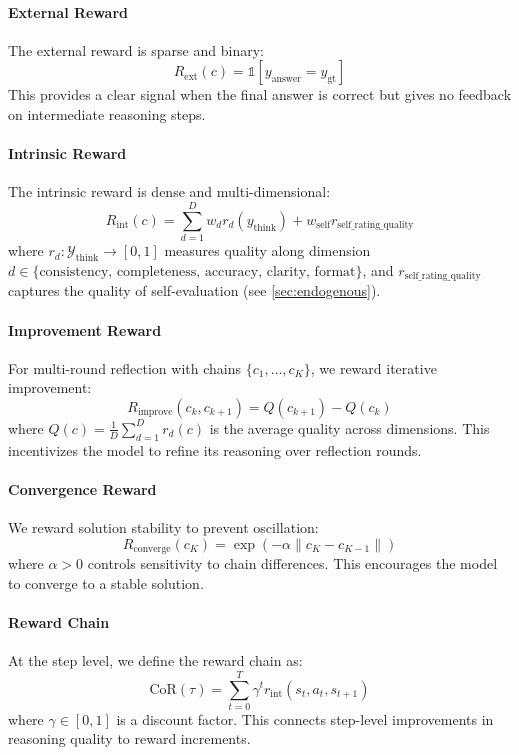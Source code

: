 \documentclass{article}
\theoremstyle{plain}
\theoremstyle{definition}
\theoremstyle{remark}
\begin{document}
\paragraph{External Reward} The external reward is sparse and binary:
\begin{equation}
R_{\text{ext}}(c) = \mathbb{1}[y_{\text{answer}} = y_{\text{gt}}]
\end{equation}
This provides a clear signal when the final answer is correct but gives no feedback on intermediate reasoning steps.

\paragraph{Intrinsic Reward} The intrinsic reward is dense and multi-dimensional:
\begin{equation}
R_{\text{int}}(c) = \sum_{d=1}^{D} w_d r_d(y_{\text{think}}) + w_{\text{self}} r_{\text{self\_rating\_quality}}
\end{equation}
where $r_d: \mathcal{Y}_{\text{think}} \to [0,1]$ measures quality along dimension $d \in \{\text{consistency, completeness, accuracy, clarity, format}\}$, and $r_{\text{self\_rating\_quality}}$ captures the quality of self-evaluation (see \autoref{sec:endogenous}).

\paragraph{Improvement Reward} For multi-round reflection with chains $\{c_1, \ldots, c_K\}$, we reward iterative improvement:
\begin{equation}
R_{\text{improve}}(c_k, c_{k+1}) = Q(c_{k+1}) - Q(c_k)
\end{equation}
where $Q(c) = \frac{1}{D}\sum_{d=1}^{D} r_d(c)$ is the average quality across dimensions. This incentivizes the model to refine its reasoning over reflection rounds.

\paragraph{Convergence Reward} We reward solution stability to prevent oscillation:
\begin{equation}
R_{\text{converge}}(c_K) = \exp(-\alpha \|c_K - c_{K-1}\|)
\end{equation}
where $\alpha > 0$ controls sensitivity to chain differences. This encourages the model to converge to a stable solution.

\paragraph{Reward Chain} At the step level, we define the reward chain as:
\begin{equation}
\text{CoR}(\tau) = \sum_{t=0}^{T} \gamma^t r_{\text{int}}(s_t, a_t, s_{t+1})
\end{equation}
where $\gamma \in [0,1]$ is a discount factor. This connects step-level improvements in reasoning quality to reward increments.
\end{document}
